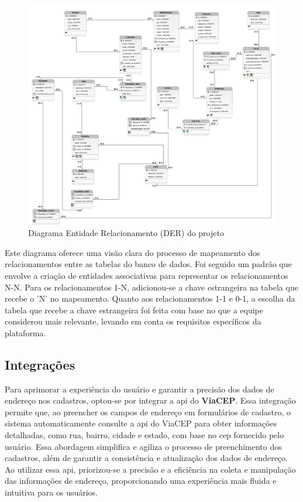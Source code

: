 \begin{figure}[ht]
        \centering
        \includegraphics[width=1.0\textwidth]{images/der.png}
        \caption{Diagrama Entidade Relacionamento (DER) do projeto}
        \label{der}
    \end{figure}
    
Este diagrama oferece uma visão clara do processo de mapeamento dos relacionamentos entre as tabelas do banco de dados. Foi seguido um padrão que envolve a criação de entidades associativas para representar os relacionamentos N-N. Para os relacionamentos 1-N, adicionou-se a chave estrangeira na tabela que recebe o 'N' no mapeamento. Quanto aos relacionamentos 1-1 e 0-1, a escolha da tabela que recebe a chave estrangeira foi feita com base no que a equipe considerou mais relevante, levando em conta os requisitos específicos da plataforma.

\subsection{Integrações}
Para aprimorar a experiência do usuário e garantir a precisão dos dados de endereço nos cadastros, optou-se por integrar a \ac{api} do \textbf{ViaCEP}. Essa integração permite que, ao preencher os campos de endereço em formulários de cadastro, o sistema automaticamente consulte a \ac{api} do ViaCEP para obter informações detalhadas, como rua, bairro, cidade e estado, com base no \ac{cep} fornecido pelo usuário. Essa abordagem simplifica e agiliza o processo de preenchimento dos cadastros, além de garantir a consistência e atualização dos dados de endereço. Ao utilizar essa \ac{api}, priorizou-se a precisão e a eficiência na coleta e manipulação das informações de endereço, proporcionando uma experiência mais fluida e intuitiva para os usuários.


